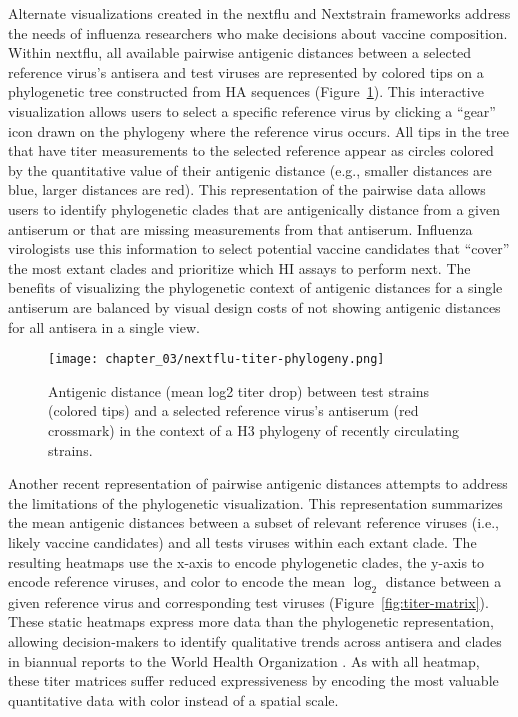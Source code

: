 Alternate visualizations created in the nextflu \citep{Neher:2015jr} and Nextstrain \citep{Hadfield2018} frameworks address the needs of influenza researchers who make decisions about vaccine composition.
Within nextflu, all available pairwise antigenic distances between a selected reference virus's antisera and test viruses are represented by colored tips on a phylogenetic tree constructed from HA sequences (Figure~\ref{fig:titer-phylogeny}).
This interactive visualization allows users to select a specific reference virus by clicking a ``gear'' icon drawn on the phylogeny where the reference virus occurs.
All tips in the tree that have titer measurements to the selected reference appear as circles colored by the quantitative value of their antigenic distance (e.g., smaller distances are blue, larger distances are red).
This representation of the pairwise data allows users to identify phylogenetic clades that are antigenically distance from a given antiserum or that are missing measurements from that antiserum.
Influenza virologists use this information to select potential vaccine candidates that ``cover'' the most extant clades and prioritize which HI assays to perform next.
The benefits of visualizing the phylogenetic context of antigenic distances for a single antiserum are balanced by visual design costs of not showing antigenic distances for all antisera in a single view.

\begin{figure}
  \centering
  \texttt{[image: chapter\_03/nextflu-titer-phylogeny.png]}
  \caption{\label{fig:titer-phylogeny} Antigenic distance (mean log2 titer drop) between test strains (colored tips) and a selected reference virus's antiserum (red crossmark) in the context of a H3 phylogeny of recently circulating strains.}
\end{figure}

Another recent representation of pairwise antigenic distances attempts to address the limitations of the phylogenetic visualization.
This representation summarizes the mean antigenic distances between a subset of relevant reference viruses (i.e., likely vaccine candidates) and all tests viruses within each extant clade.
The resulting heatmaps use the x-axis to encode phylogenetic clades, the y-axis to encode reference viruses, and color to encode the mean $\log_{2}$ distance between a given reference virus and corresponding test viruses (Figure~\ref{fig:titer-matrix}).
These static heatmaps express more data than the phylogenetic representation, allowing decision-makers to identify qualitative trends across antisera and clades in biannual reports to the World Health Organization \citep{Bedford271114,Bedford780627}.
As with all heatmap, these titer matrices suffer reduced expressiveness by encoding the most valuable quantitative data with color instead of a spatial scale.

